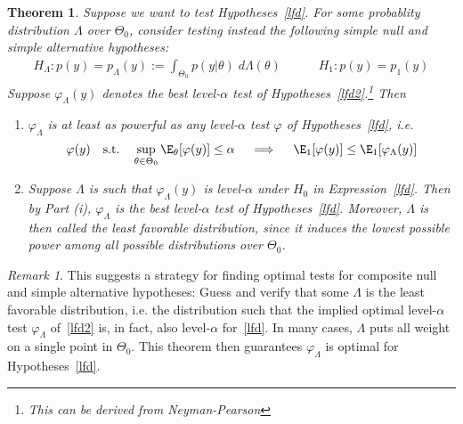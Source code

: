 \documentclass[12pt]{article}
\theoremstyle{plain}
\newtheorem{thm}{Theorem}[section]
\theoremstyle{definition}
\theoremstyle{remark}
\newtheorem*{rmk}{Remark}
\begin{document}
\begin{thm}
Suppose we want to test Hypotheses~\ref{lfd}.
For some probablity distribution $\Lambda$ over $\Theta_0$, consider
testing instead the following simple null and simple alternative
hypotheses:
\begin{align}
  H_\Lambda:
  p(y) = p_\Lambda(y) := \int_{\Theta_0} p(y|\theta)\;d\Lambda(\theta)
  \qquad\quad
  H_1: p(y) = p_1(y)
  \label{lfd2}
\end{align}
Suppose $\varphi_\Lambda(y)$ denotes the best level-$\alpha$ test of
Hypotheses~\ref{lfd2}.\footnote{%
  This can be derived from Neyman-Pearson
}
Then
\begin{enumerate}[label=\emph{(\roman*)}]
  \item
    $\varphi_\Lambda$ is at least as powerful as any level-$\alpha$ test
    $\varphi$ of Hypotheses~\ref{lfd}, i.e.
    \begin{align*}
      \varphi(y)
      \quad \text{s.t.}\quad
      \sup_{\theta\in\Theta_0}
      \E_\theta[\varphi(y)]\leq\alpha
      \quad\implies\quad
      \E_1[\varphi(y)]\leq\E_1[\varphi_\Lambda(y)]
    \end{align*}

  \item
    Suppose $\Lambda$ is such that $\varphi_\Lambda(y)$ is
    level-$\alpha$ under $H_0$ in Expression~\ref{lfd}. Then by Part
    (i), $\varphi_\Lambda$ is the \emph{best} level-$\alpha$ test of
    Hypotheses~\ref{lfd}.
    Moreover, $\Lambda$ is then called the least favorable distribution,
    since it induces the lowest possible power among all possible
    distributions over $\Theta_0$.
\end{enumerate}
\end{thm}
\begin{rmk}
This suggests a strategy for finding optimal tests for composite null
and simple alternative hypotheses:
Guess and verify that some $\Lambda$ is the least favorable
distribution, i.e. the distribution such that the implied optimal
level-$\alpha$ test $\varphi_\Lambda$ of~\ref{lfd2} is, in fact, also
level-$\alpha$ for~\ref{lfd}.
In many cases, $\Lambda$ puts all weight on a single point in
$\Theta_0$.
This theorem then guarantees $\varphi_\Lambda$ is optimal for
Hypotheses~\ref{lfd}.
\end{rmk}
\end{document}
